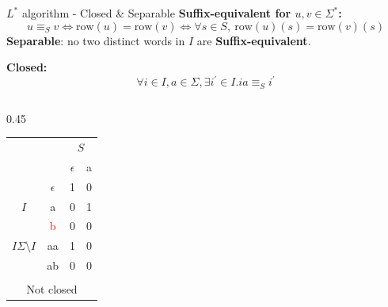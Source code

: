 \documentclass{beamer}
\begin{document}
\begin{frame}{$L^*$ algorithm - Closed \&  Separable}
    \small
    \setlength{\abovedisplayskip}{3pt}
    \setlength{\belowdisplayskip}{3pt}
    \textbf{Suffix-equivalent for $u, v \in \Sigma^{*}$: }
    $$
        u \equiv_{S} v
        \Leftrightarrow
        \text{row}(u) = \text{row}(v)
        \Leftrightarrow
        \forall s \in S,\ \text{row}(u)(s) = \text{row}(v)(s)
    $$
    \textbf{\small Separable}: \small no two distinct words in $I$ are \textbf{Suffix-equivalent}. 

    \textbf{Closed: }
    $$
        \forall i \in I , a \in \Sigma, \exists i^{\prime} \in I.ia \equiv_{S} i^{\prime}
    $$
    \begin{columns}[T,onlytextwidth]
        \begin{column}{0.45\textwidth} 
            \centering
            \begin{tabular}{cc|c|c}
                &   & \multicolumn{2}{c}{$S$} \\ 
                \multicolumn{2}{c|}{} & $\epsilon$ & a \\ \hline
                & $\epsilon$ & 1 & 0 \\
                {$I$}& a          & 0 & 1 \\ \hline
                 & \textcolor{red}{b}          & 0 & 0 \\
                {$I\Sigma\setminus I$}           & aa& 1& 0 \\
                & ab& 0&0\\ 
                \multicolumn{4}{c}{} \\[-0.8em] 
                \multicolumn{4}{c}{\footnotesize Not closed}
            \end{tabular}
        \end{column}
    

\end{columns}
\end{frame}
\end{document}
